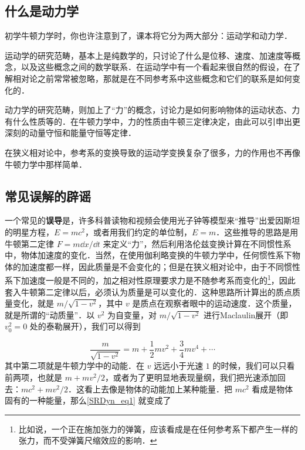 




\subsection{什么是动力学}
初学牛顿力学时，你也许注意到了，课本将它分为两大部分：运动学和动力学．

运动学的研究范畴，基本上是纯数学的，只讨论了什么是位移、速度、加速度等概念，以及这些概念之间的数学联系．在运动学中有一个看起来很自然的假设，在了解相对论之前常常被忽略，那就是在不同参考系中这些概念和它们的联系是如何变化的．

动力学的研究范畴，则加上了“力”的概念，讨论力是如何影响物体的运动状态、力有什么性质等的．在牛顿力学中，力的性质由牛顿三定律决定，由此可以引申出更深刻的动量守恒和能量守恒等定律．

在狭义相对论中，参考系的变换导致的运动学变换复杂了很多，力的作用也不再像牛顿力学中那样简单．

\subsection{常见误解的辟谣}
一个常见的\textbf{误导}是，许多科普读物和视频会使用光子钟等模型来“推导”出爱因斯坦的明星方程，$E=mc^2$，或者用我们约定的单位制，$E=m$．这些推导的思路是用牛顿第二定律 $F=m\dd x/\dd t$ 来定义“力”，然后利用洛伦兹变换计算在不同惯性系中，物体加速度的变化．当然，在使用伽利略变换的牛顿力学中，任何惯性系下物体的加速度都一样，因此质量是不会变化的；但是在狭义相对论中，由于不同惯性系下加速度一般是不同的，加之相对性原理要求力是不随参考系而变化的\footnote{比如说，一个正在施加张力的弹簧，应该看成是在任何参考系下都产生一样的张力，而不受弹簧尺缩效应的影响．}，因此套入牛顿第二定律以后，必须认为质量是可以变化的．这种思路所计算出的质点质量变化，就是 $m/\sqrt{1-v^2}$，其中 $v$ 是质点在观察者眼中的运动速度．这个质量，就是所谓的“动质量”．以 $v^2$ 为自变量，对 $m/\sqrt{1-v^2}$ 进行Maclaulin展开（即 $v_0^2=0$ 处的泰勒展开），我们可以得到

\begin{equation}\label{SRDyn_eq1}
\frac{m}{\sqrt{1-v^2}}=m+\frac{1}{2}mv^2+\frac{3}{4}mv^4+\cdots
\end{equation}
其中第二项就是牛顿力学中的动能．在 $v$ 远远小于光速 $1$ 的时候，我们可以只看前两项，也就是 $m+mv^2/2$，或者为了更明显地表现量纲，我们把光速添加回去：$mc^2+mv^2/2$．这看上去像是物体的动能加上某种能量．把 $mc^2$ 看成是物体固有的一种能量，那么\autoref{SRDyn_eq1} 就变成了

